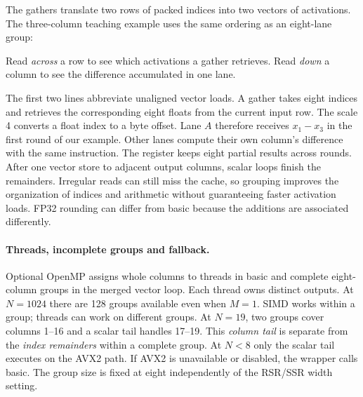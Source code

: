 \documentclass[11pt,a4paper]{article}
\newcommand{\code}[1]{\texttt{\detokenize{#1}}}
\begin{document}
The gathers translate two rows of packed indices into two vectors of activations. The
three-column teaching example uses the same ordering as an eight-lane group:
\begin{center}
\end{center}
Read \emph{across} a row to see which activations a gather retrieves. Read
\emph{down} a column to see the difference accumulated in one lane.

The first two lines abbreviate unaligned vector loads. A gather takes eight
indices and retrieves the corresponding eight floats from the current input
row. The scale 4 converts a float index to a byte offset. Lane \(A\)
therefore receives \(x_1-x_3\) in the first round of our example. Other
lanes compute their own column's difference with the same instruction.
The register \code{acc} keeps eight partial results across rounds. After
one vector store to adjacent output columns, scalar loops finish the
remainders. Irregular reads can still miss the cache, so grouping improves
the organization of indices and arithmetic without guaranteeing faster
activation loads. FP32 rounding can differ from basic because the additions
are associated differently.

\paragraph{Threads, incomplete groups and fallback.}
Optional OpenMP assigns whole columns to threads in basic and complete
eight-column groups in the merged vector loop. Each thread owns distinct
outputs. At \(N=1024\) there are 128 groups available even when \(M=1\).
SIMD works within a group; threads can work on different groups.
At \(N=19\), two groups cover columns 1--16 and a scalar tail handles
17--19. This \emph{column tail} is separate from the \emph{index remainders}
within a complete group. At \(N<8\) only the scalar tail executes on the
AVX2 path. If AVX2 is unavailable or disabled, the wrapper calls basic.
The group size is fixed at eight independently of the RSR/SSR width setting.
\end{document}
